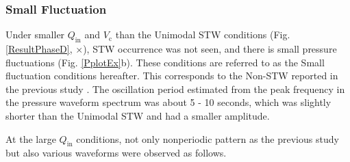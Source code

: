 \documentclass[aps,pre,preprint,groupedaddress,showkeys]{revtex4-2}
\begin{document}
\subsubsection{Small Fluctuation}
Under smaller $Q_\mathrm{in}$ and $V_ \mathrm {c} $ than the Unimodal STW conditions (Fig. \ref {ResultPhaseD}, $\times$), STW occurrence was not seen, and there is small pressure fluctuations (Fig. \ref {PplotEx}b).
These conditions are referred to as the Small fluctuation conditions hereafter.
This corresponds to the Non-STW reported in the previous study \citep{kanno2018}.
The oscillation period estimated from the peak frequency in the pressure waveform spectrum was about 5 - 10 seconds, which was slightly shorter than the Unimodal STW and had a smaller amplitude.

At the large $Q_\mathrm{in}$ conditions, not only nonperiodic pattern as the previous study but also various waveforms were observed as follows.
\end{document}
